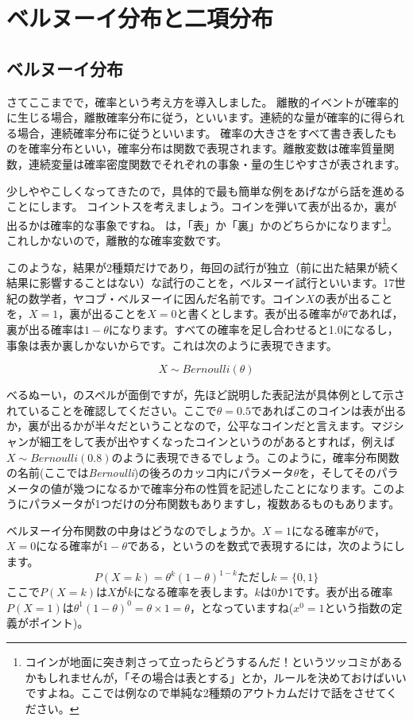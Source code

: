 \documentclass{ltjbook}
\begin{document}
\section{ベルヌーイ分布と二項分布}
\subsection{ベルヌーイ分布}
さてここまでで，確率という考え方を導入しました。
離散的イベントが確率的に生じる場合，離散確率分布に従う，といいます。連続的な量が確率的に得られる場合，連続確率分布に従うといいます。
確率の大きさをすべて書き表したものを確率分布といい，確率分布は関数で表現されます。離散変数は確率質量関数，連続変量は確率密度関数でそれぞれの事象・量の生じやすさが表されます。

少しややこしくなってきたので，具体的で最も簡単な例をあげながら話を進めることにします。
コイントスを考えましょう。コインを弾いて表が出るか，裏が出るかは確率的な事象ですね。
は，「表」か「裏」かのどちらかになります\footnote{コインが地面に突き刺さって立ったらどうするんだ！というツッコミがあるかもしれませんが，「その場合は表とする」とか，ルールを決めておけばいいですよね。ここでは例なので単純な2種類のアウトカムだけで話をさせてください。}。これしかないので，離散的な確率変数です。

このような，結果が2種類だけであり，毎回の試行が独立（前に出た結果が続く結果に影響することはない）な試行のことを，ベルヌーイ試行といいます。17世紀の数学者，ヤコブ・ベルヌーイに因んだ名前です。コイン$X$の表が出ることを，$X=1$，裏が出ることを$X=0$と書くとします。表が出る確率が$\theta$であれば，裏が出る確率は$1-\theta$になります。すべての確率を足し合わせると1.0になるし，事象は表か裏しかないからです。これは次のように表現できます。

\[ X \sim Bernoulli(\theta) \]

べるぬーい，のスペルが面倒ですが，先ほど説明した表記法が具体例として示されていることを確認してください。ここで$\theta=0.5$であればこのコインは表が出るか，裏が出るかが半々だということなので，公平なコインだと言えます。マジシャンが細工をして表が出やすくなったコインというのがあるとすれば，例えば$X \sim Bernoulli(0.8)$のように表現できるでしょう。このように，確率分布関数の名前(ここでは\textit{Bernoulli})の後ろのカッコ内にパラメータ$\theta$を，そしてそのパラメータの値が幾つになるかで確率分布の性質を記述したことになります。このようにパラメータが1つだけの分布関数もありますし，複数あるものもあります。

ベルヌーイ分布関数の中身はどうなのでしょうか。$X=1$になる確率が$\theta$で，$X=0$になる確率が$1-\theta$である，というのを数式で表現するには，次のようにします。
\[  P(X=k) = \theta^k(1-\theta)^{1-k} \mbox{ただし$k=\{0,1\}$} \]
ここで$P(X=k)$は$X$が$k$になる確率を表します。$k$は0か1です。表が出る確率$P(X=1)$は$\theta^1(1-\theta)^0=\theta \times 1=\theta$，となっていますね($x^0=1$という指数の定義がポイント)。
\end{document}
